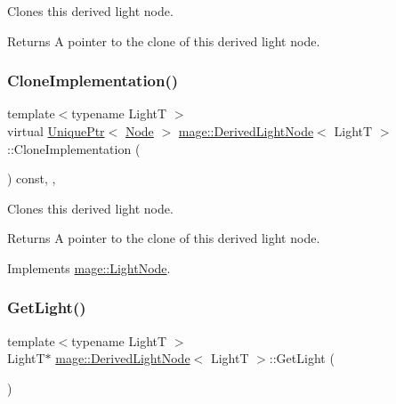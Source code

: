 Clones this derived light node.

\begin{DoxyReturn}{Returns}
A pointer to the clone of this derived light node. 
\end{DoxyReturn}
\hypertarget{classmage_1_1_derived_light_node_acf8858989780bf45a45c55a7c5564314}{}\label{classmage_1_1_derived_light_node_acf8858989780bf45a45c55a7c5564314} 
\subsubsection{\texorpdfstring{Clone\+Implementation()}{CloneImplementation()}}
{\footnotesize\ttfamily template$<$typename LightT $>$ \\
virtual \hyperlink{namespacemage_a8c307fbcc33bce9b7f2aa4c26c3b95cf}{Unique\+Ptr}$<$ \hyperlink{classmage_1_1_node}{Node} $>$ \hyperlink{classmage_1_1_derived_light_node}{mage\+::\+Derived\+Light\+Node}$<$ LightT $>$\+::Clone\+Implementation (\begin{DoxyParamCaption}{ }\end{DoxyParamCaption}) const\hspace{0.3cm}{\ttfamily [override]}, {\ttfamily [private]}, {\ttfamily [virtual]}}

Clones this derived light node.

\begin{DoxyReturn}{Returns}
A pointer to the clone of this derived light node. 
\end{DoxyReturn}


Implements \hyperlink{classmage_1_1_light_node_aea97601d0a4b8073a1c655ca334af242}{mage\+::\+Light\+Node}.

\hypertarget{classmage_1_1_derived_light_node_a1f45fa421b75d663a360bfdd518a1a1d}{}\label{classmage_1_1_derived_light_node_a1f45fa421b75d663a360bfdd518a1a1d} 
\subsubsection{\texorpdfstring{Get\+Light()}{GetLight()}\hspace{0.1cm}{\footnotesize\ttfamily [1/2]}}
{\footnotesize\ttfamily template$<$typename LightT $>$ \\
LightT$\ast$ \hyperlink{classmage_1_1_derived_light_node}{mage\+::\+Derived\+Light\+Node}$<$ LightT $>$\+::Get\+Light (\begin{DoxyParamCaption}{ }\end{DoxyParamCaption})\hspace{0.3cm}{\ttfamily [noexcept]}}

